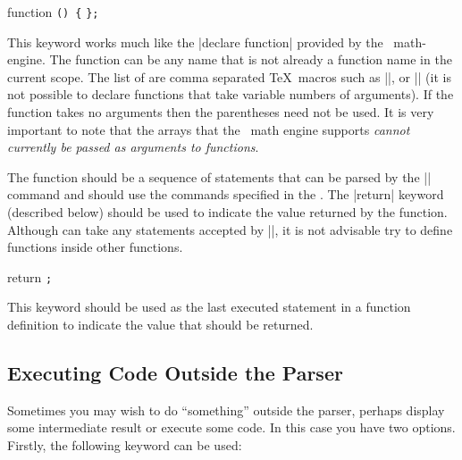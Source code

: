 \begin{math-keyword}{{function} \texttt{(}\texttt{) \{}  \texttt{\};}}

  This keyword works much like the |declare function| provided by the
  \pgfname\ math-engine.
  The function  can be any name that is not already a
  function name in the current scope. The list of  are 
  comma separated \TeX\ macros such as |\x|, or |\y| (it is not
  possible to declare functions that take variable numbers of arguments). 
  If the function
  takes no arguments then the parentheses need not be used.
  It is very important to note that the arrays that the
  \pgfname\ math engine supports 
  \emph{cannot currently be passed as arguments to functions}.
  
  
  The function  should be a sequence of statements
  that can be parsed by the |\tikzmath| command and 
  should use the commands specified in the .  
  The |return| keyword (described below) should be used to indicate
  the value returned by the function.
  Although  can take any statements accepted by
  |\tikzmath|, it is not advisable try to define functions inside other 
  functions.
  
\begin{codeexample}[]
\end{codeexample}
  
\end{math-keyword}

\begin{math-keyword}{{return} \texttt{;}}
  
  This keyword should be used as the last executed statement 
  in a function definition to indicate the value that should be 
  returned.
  
\end{math-keyword}


\subsection{Executing Code Outside the Parser}
  
  Sometimes you may wish to do ``something'' outside the parser,
  perhaps display some intermediate result or execute some code.
  In this case
  you have two options. Firstly, the following keyword can be used:
    
